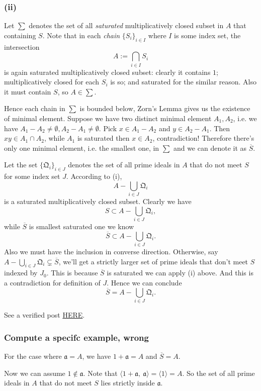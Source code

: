 \subsubsection{(ii)}

Let $\sum$ denotes the set of all \textit{saturated} multiplicatively closed subset in $A$ that containing $S$. Note that in each \textit{chain} $\{S_i\}_{i\in I}$ where $I$ is some index set, the intersection 
$$A:=\bigcap_{i\in I} S_i$$ is again saturated multiplicatively closed subset: clearly it contains $1$; multiplicatively closed for each $S_i$ is so; and saturated for the similar reason. Also it must contain $S$, so $A\in\sum$.

Hence each chain in $\sum$ is bounded below, Zorn's Lemma gives us the existence of minimal element. 
Suppose we have two distinct minimal element $A_1,A_2$, i.e. we have $A_1-A_2\neq\emptyset,A_2-A_1\neq\emptyset$. Pick $x\in A_1-A_2$ and $y\in A_2-A_1$. Then $xy\in A_1\cap A_2$, while $A_1$ is saturated then $x\in A_2$, contradiction! Therefore there's only one minimal element, i.e. the smallest one, in $\sum$ and we can denote it as $\overline{S}$.

Let the set $\{\mathfrak Q_i\}_{i\in J}$ denotes the set of all prime ideals in $A$ that do not meet $S$ for some index set $J$. According to (i),
$$A-\bigcup_{i\in J}\mathfrak Q_i$$ is a saturated multiplicatively closed subset. 
Clearly we have 
$$S\subset A-\bigcup_{i\in J}\mathfrak Q_i,$$ while $\overline{S}$ is smallest saturated one we know
$$\overline{S} \subset A-\bigcup_{i\in J}\mathfrak Q_i.$$
Also we must have the inclusion in converse direction. Otherwise, say $A-\bigcup_{i\in J}\mathfrak Q_i\subsetneq \overline{S}$, we'll get a strictly larger set of prime ideals that don't meet $S$ indexed by $J_0$. This is because $\overline{S}$ is saturated we can apply (i) above. And this is a contradiction for definition of $J$. Hence we can conclude 
$$\overline{S}= A-\bigcup_{i\in J}\mathfrak Q_i.$$

See a verified post \href{http://www.math.caltech.edu/~2016-17/1term/ma120a/solutions/Sol1.pdf}{HERE}. 

\subsubsection{Compute a specifc example, wrong}

For the case where $\mathfrak a=A$, we have $1+\mathfrak a=A$ and $\overline{S}=A$.

Now we can assume $1\notin \mathfrak a$.
Note that $\langle 1+\mathfrak a,~ \mathfrak a\rangle=\langle 1\rangle=A$. So the set of all prime ideals in $A$ that do not meet $S$ lies strictly inside $\mathfrak a$. 

